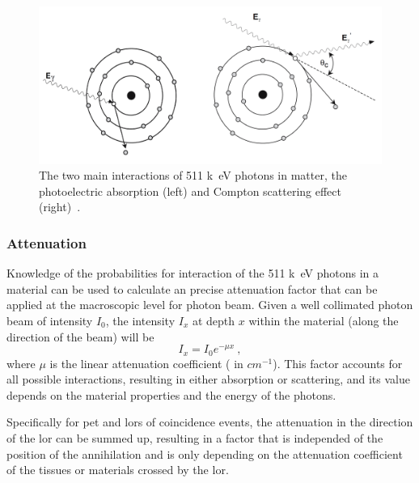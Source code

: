 \begin{figure} [h!]
\centering
\includegraphics[scale=0.45,angle=0]{2_Theory_Methods/figures/Bailey_gamma_interactions.png}
\caption{The two main interactions of 511 \si{k\electronvolt} photons in matter, the photoelectric absorption (left) and Compton scattering effect (right)~\cite{Bailey2005}.} 
\label{fig_2:511_interactions}
\end{figure} 

\subsubsection{Attenuation}
Knowledge of the probabilities for interaction of the 511 \si{k\electronvolt} photons in a material can be used to calculate an precise attenuation factor that can be applied at the macroscopic level for photon beam. Given a well collimated photon beam of intensity $I_0$, the intensity $I_x$ at depth $x$ within the material (along the direction of the beam) will be
\begin{equation} \label{Attenuation}
I_x = I_0 e^{-\mu x} \ ,
\end{equation}
where $\mu$ is the linear attenuation coefficient ( in $cm^{-1}$). This factor accounts for all possible interactions, resulting in either absorption or scattering, and its value depends on the material properties and the energy of the photons.

Specifically for pet and \glspl{lor} of coincidence events, the attenuation in the direction of the \gls{lor} can be summed up, resulting in a factor that is independed of the position of the annihilation and is only depending on the attenuation coefficient of the tissues or materials crossed by the \gls{lor}. 

